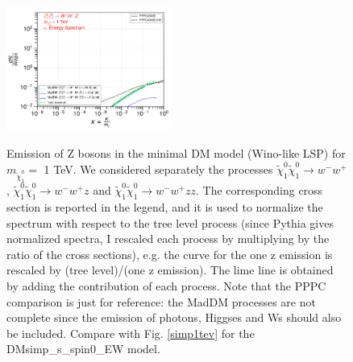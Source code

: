 \documentclass[epj,nopacs,fleqn]{svjour}
\begin{document}
\begin{figure}[!h]
\subfigure
{\includegraphics[width=0.48\textwidth]{Fig/Validation_1009/1_neutrinos_tau_n1ww_single_1.pdf} }

\caption{Emission of Z bosons in the minimal DM model (Wino-like LSP) for $m_{\tilde \chi_1 ^0}=$ 1 TeV. We considered separately the processes  $\tilde \chi _1 ^0  \tilde \chi _1 ^0 \rightarrow w^- w^+$,  $\tilde \chi _1 ^0  \tilde \chi _1 ^0 \rightarrow w^- w^+z$ and  $\tilde \chi _1 ^0  \tilde \chi _1 ^0 \rightarrow w^- w^+ zz$. The corresponding cross section is reported in the legend, and it is used to normalize the spectrum with respect to the tree level process (since Pythia gives normalized spectra, I rescaled each process by multiplying by the ratio of the cross sections), e.g. the curve for the one z emission is rescaled by (tree level)/(one z emission). The lime line is obtained by adding the contribution of each process. Note that the PPPC comparison is just for reference: the MadDM processes are not complete since the emission of photons, Higgses and Ws should also be included. Compare with Fig. \ref{simp1tev} for the DMsimp\_s\_spin0\_EW model.}
\label{singleemission_1tev}
\end{figure}
\end{document}
